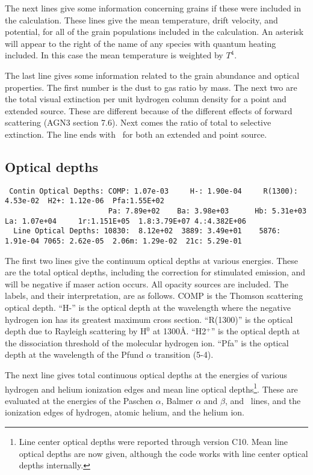 The next lines give some information concerning grains if these were
included in the calculation.
These lines give the mean temperature, drift
velocity, and potential, for all of the grain populations included in the
calculation.
An asterisk will appear to the right of the name of any
species with quantum heating included.
In this case the mean temperature
is weighted by $T^4$.

The last line gives some information related to the grain abundance and
optical properties.
The first number is the dust to gas ratio by mass.
The next two are the total visual extinction per unit hydrogen column density
for a point and extended source.
These are different because of the
different effects of forward scattering (AGN3 section 7.6).
Next comes
the ratio of total to selective extinction.
The line ends with \Av\ for both
an extended and point source.

\subsection{Optical depths}
{\setverbatimfontsize{\tiny}
\begin{verbatim}
 Contin Optical Depths: COMP: 1.07e-03     H-: 1.90e-04     R(1300): 4.53e-02  H2+: 1.12e-06  Pfa:1.55E+02
                        Pa: 7.89e+02    Ba: 3.98e+03      Hb: 5.31e+03    La: 1.07e+04     1r:1.151E+05  1.8:3.79E+07 4.:4.382E+06
  Line Optical Depths: 10830:  8.12e+02  3889: 3.49e+01    5876: 1.91e-04 7065: 2.62e-05  2.06m: 1.29e-02  21c: 5.29e-01
\end{verbatim}
}

The first two lines give the continuum optical depths at various energies.
These are the total optical depths, including the correction for stimulated
emission, and will be negative if maser action occurs. All opacity sources
are included.
The labels, and their interpretation, are as follows. COMP
is the Thomson scattering optical depth.
``H-'' is the optical depth at the
wavelength where the negative hydrogen ion has its greatest maximum cross
section.
``R(1300)'' is the optical depth due to Rayleigh scattering by
H$^0$ at 1300\AA .
``H2$^+$'' is the optical depth at the dissociation threshold
of the molecular hydrogen ion.
``Pfa'' is the optical depth at the
wavelength of the Pfund $\alpha$ transition (5-4).

The next line gives total continuous optical depths at the energies of
various hydrogen and helium ionization edges and 
mean line optical depths\footnote{Line center optical depths were reported through version C10.
Mean line optical depths are now given, although the code works
with line center optical depths internally.}. These are evaluated
at the energies of the Paschen $\alpha$, Balmer $\alpha$ and $\beta$, and
\la\ lines, and the
ionization edges of hydrogen, atomic helium, and the helium ion.

